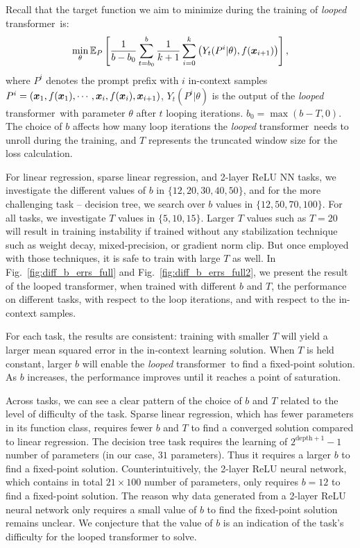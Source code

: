 \documentclass{article} %
\newcommand{\loopTF}{\emph{looped} transformer}
\theoremstyle{plain}
\theoremstyle{definition}
\theoremstyle{remark}
\begin{document}
Recall that the target function we aim to minimize during the training of \loopTF\ is:
\begin{equation*}
\min_{\theta} \mathbb{E}_P \left[\frac{1}{b - b_0}\sum_{t=b_{0}}^{b} \frac{1}{k+1} \sum_{i=0}^k \left(Y_t(P^i | \theta), f({\bm{x}}_{i+1})\right)\right],    
\end{equation*}
where $P^i$ denotes the prompt prefix with $i$ in-context samples $P^i =({\bm{x}}_1, f({\bm{x}}_1), \cdots, {\bm{x}}_i, f({\bm{x}}_i), {\bm{x}}_{i+1})$, $Y_t(P^i | \theta)$ is the output of the \loopTF\ with parameter $\theta$ after $t$ looping iterations. $b_0 = \max (b-T, 0)$. 
The choice of $b$ affects how many loop iterations the \loopTF\ needs to unroll during the training, and $T$ represents the truncated window size for the loss calculation.

For linear regression, sparse linear regression, and 2-layer ReLU NN tasks, we investigate the different values of $b$ in $\{12, 20, 30, 40, 50\}$, and for the more challenging task -- decision tree, we search over $b$ values in $\{12, 50, 70, 100\}$. For all tasks, we investigate $T$ values in $\{5, 10, 15\}$. Larger $T$ values such as $T=20$ will result in training instability if trained without any stabilization technique such as weight decay, mixed-precision, or gradient norm clip. But once employed with those techniques, it is safe to train with large $T$ as well. In Fig.~\ref{fig:diff_b_errs_full} and Fig.~\ref{fig:diff_b_errs_full2}, we present the result of the looped transformer, when trained with different $b$ and $T$, the performance on different tasks, with respect to the loop iterations, and with respect to the in-context samples.

For each task, the results are consistent: training with smaller $T$ will yield a larger mean squared error in the in-context learning solution. When $T$ is held constant, larger $b$ will enable the \loopTF\ to find a fixed-point solution. As $b$ increases, the performance improves until it reaches a point of saturation.

Across tasks, we can see a clear pattern of the choice of $b$ and $T$ related to the level of difficulty of the task. Sparse linear regression, which has fewer parameters in its function class, requires fewer $b$ and $T$ to find a converged solution compared to linear regression. The decision tree task requires the learning of $2^{\text{depth} + 1} - 1$ number of parameters (in our case, $31$ parameters). Thus it requires a larger $b$ to find a fixed-point solution. Counterintuitively, the 2-layer ReLU neural network, which contains in total $21 \times 100$ number of parameters, only requires $b=12$ to find a fixed-point solution. The reason why data generated from a 2-layer ReLU neural network only requires a small value of $b$ to find the fixed-point solution remains unclear. We conjecture that the value of $b$ is an indication of the task's difficulty for the looped transformer to solve.
\end{document}
